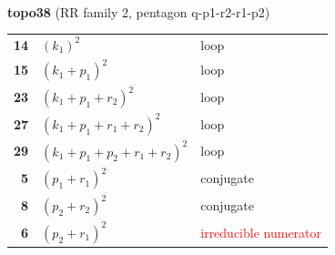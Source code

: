\documentclass[10pt]{article}
\begin{document}
\begin{minipage}[t]{0.48\textwidth}
{}\\[2mm]\textbf{topo38} (RR family 2, pentagon q-p1-r2-r1-p2)\\[2pt]{\footnotesize\begin{tabular}{@{}r@{\ \ }l@{\ \ }l@{}}\textbf{14} & $(k_1)^2$ & loop\\
\textbf{15} & $(k_1+p_1)^2$ & loop\\
\textbf{23} & $(k_1+p_1+r_2)^2$ & loop\\
\textbf{27} & $(k_1+p_1+r_1+r_2)^2$ & loop\\
\textbf{29} & $(k_1+p_1+p_2+r_1+r_2)^2$ & loop\\
\textbf{5} & $(p_1+r_1)^2$ & conjugate\\
\textbf{8} & $(p_2+r_2)^2$ & conjugate\\
\textbf{6} & $(p_2+r_1)^2$ & \textcolor{red}{irreducible numerator}\\\end{tabular}}\end{minipage}

\bigskip
\end{document}
